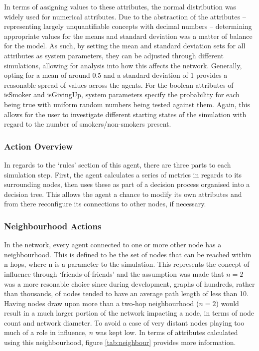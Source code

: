 \documentclass[]{report}
\begin{document}
In terms of assigning values to these attributes, the normal distribution was widely used for numerical attributes. Due to the abstraction of the attributes – representing largely unquantifiable concepts with decimal numbers – determining appropriate values for the means and standard deviation was a matter of balance for the model. As such, by setting the mean and standard deviation sets for all attributes as system parameters, they can be adjusted through different simulations, allowing for analysis into how this affects the network.  Generally, opting for a mean of around 0.5 and a standard deviation of 1 provides a reasonable spread of values across the agents. For the boolean attributes of isSmoker and isGivingUp, system parameters specify the probability for each being true with uniform random numbers being tested against them. Again, this allows for the user to investigate different starting states of the simulation with regard to the number of smokers/non-smokers present.

\subsubsection{Action Overview}
In regards to the `rules' section of this agent, there are three parts to each simulation step. First, the agent calculates a series of metrics in regards to its surrounding nodes, then uses these as part of a decision process organised into a decision tree. This allows the agent a chance to modify its own attributes and from there reconfigure its connections to other nodes, if necessary.
\subsubsection{Neighbourhood Actions}
In the network, every agent connected to one or more other node has a neighbourhood. This is defined to be the set of nodes that can be reached within n hops, where n is a parameter to the simulation. This represents the concept of influence through `friends-of-friends' and the assumption was made that $n=2$ was a more resonable choice since during development,  graphs of hundreds, rather than thousands, of nodes tended to have an average path length of less than 10. Having nodes draw upon more than a two-hop neighbourhood ($n=2$) would result in a much larger portion of the network impacting a node, in terms of node count and network diameter. To avoid a case of very distant nodes playing too much of a role in influence, $n$ was kept low. In terms of attributes calculated using this neighbourhood, figure \ref{tab:neighbour} provides more information.
\end{document}
